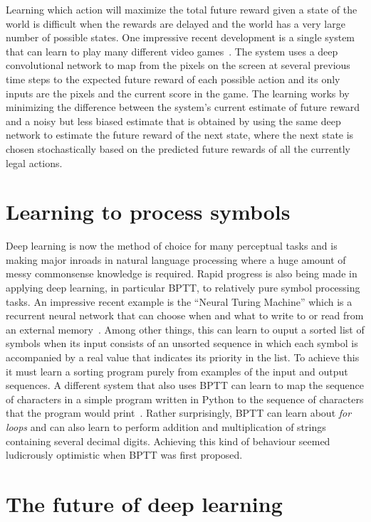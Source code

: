 \documentclass[]{article}
\begin{document}
Learning which action will maximize the total future reward given a state
of the world is difficult when the rewards are delayed and the world has a
very large number of possible states. One impressive recent development is
a single system that can learn to play many different video
games~\citep{Deepmind-atari-arxiv2013}. The system uses a deep convolutional network to
map from the pixels on the screen at several previous time steps to the
expected future reward of each possible action and its only inputs are the
pixels and the current score in the game. The learning works by minimizing
the difference between the system's current estimate of future reward and a
noisy but less biased estimate that is obtained by using the same deep
network to estimate the future reward of the next state, where the next
state is chosen stochastically based on the predicted future rewards of all
the currently legal actions.

\section{Learning to process symbols}

Deep learning is now the method of choice for many perceptual tasks and is
making major inroads in natural language processing where a huge amount of
messy commonsense knowledge is required. Rapid progress is also being made
in applying deep learning, in particular BPTT, to relatively pure symbol processing tasks.
An impressive recent example is the ``Neural Turing Machine'' which is a
recurrent neural network that can choose when and what to write to or read
from an external memory~\citep{Graves-et-al-arxiv2014}. 
Among other things, this can learn to
ouput a sorted list of symbols when its input consists of an unsorted
sequence in which each symbol is accompanied by a real value that indicates
its priority in the list.  To achieve this it must learn a sorting program
purely from examples of the input and output sequences.  A different system
that also uses BPTT can learn to map the sequence of characters in a simple
program written in Python to the sequence of characters that the program
would print~\citep{Zaremba+Sutskever-arxiv2014}. 
Rather surprisingly, BPTT can learn about {\it for
  loops} and can also learn to perform addition and multiplication of
strings containing several decimal digits. Achieving this kind of behaviour
seemed ludicrously optimistic when BPTT was first proposed.
  
\section{The future of deep learning}
\end{document}
